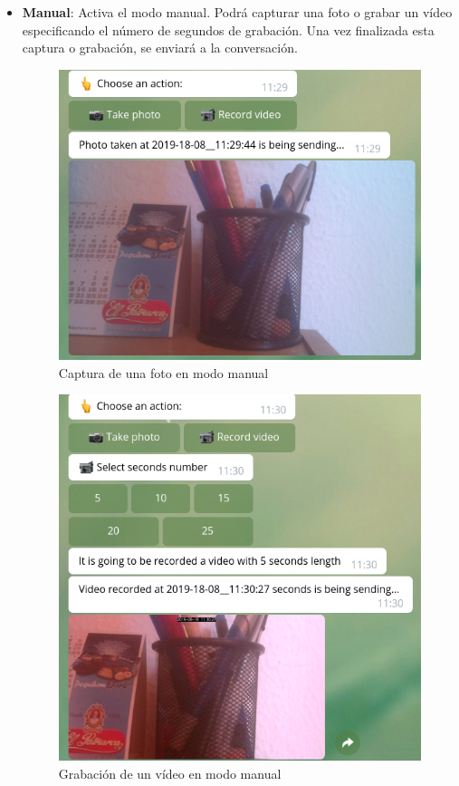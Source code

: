 \begin{itemize}

\item \textbf{Manual}: Activa el modo manual. Podrá capturar una foto o grabar un vídeo especificando el número de segundos de grabación. Una vez finalizada esta captura o grabación, se enviará a la conversación.

\begin{figure}[H]
	\centering
	\includegraphics[scale=0.45]{images/61}
	\caption{Captura de una foto en modo manual}
\end{figure}

\begin{figure}[H]
	\centering
	\includegraphics[scale=0.45]{images/62}
	\caption{Grabación de un vídeo en modo manual}
\end{figure}


\end{itemize}
